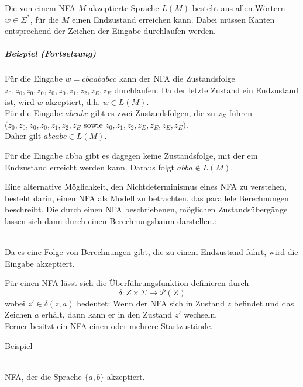 \documentclass[a4paper]{scrartcl}
\begin{document}
Die von einem NFA $M$ akzeptierte Sprache $L(M)$ besteht aus allen Wörtern $w \in \Sigma^*$, für die $M$ einen Endzustand erreichen kann. Dabei müssen Kanten entsprechend der Zeichen der Eingabe durchlaufen werden.

\subparagraph{Beispiel (Fortsetzung)} Für die Eingabe $w=cbaab\underline{abc}c$ kann der NFA die Zustandsfolge $z_0,z_0,z_0,z_0,z_0,z_0,z_1,z_2,z_E,z_E$ durchlaufen. Da der letzte Zustand ein Endzustand ist, wird $w$ akzeptiert, d.h. $w \in L(M)$.\\
Für die Eingabe $abcabc$ gibt es zwei Zustandsfolgen, die zu $z_E$ führen $(z_0,z_0,z_0,z_0,z_1,z_2,z_E$ sowie $ z_0,z_1,z_2,z_E,z_E,z_E,z_E)$.\\ Daher gilt $abcabc \in L(M)$.

Für die Eingabe abba gibt es dagegen keine Zustandsfolge, mit der ein Endzustand erreicht werden kann. Daraus folgt $abba \notin L(M)$.

Eine alternative Möglichkeit, den Nichtdeterminismus eines NFA zu verstehen, besteht darin, einen NFA als Modell zu betrachten, das parallele Berechnungen beschreibt. Die durch einen NFA beschriebenen, möglichen Zustandsübergänge lassen sich dann durch einen Berechnungsbaum darstellen.:\\
\\
Da es eine Folge von Berechnungen gibt, die zu einem Endzustand führt, wird die Eingabe akzeptiert.

Für einen NFA lässt sich die Überführungsfunktion definieren durch
\[ \delta: Z \times \Sigma \to \mathcal{P}(Z) \]
wobei $z' \in \delta(z,a)$ bedeutet: Wenn der NFA sich in Zustand $z$ befindet und das Zeichen $a$ erhält, dann kann er in den Zustand $z'$ wechseln.\\
Ferner besitzt ein NFA einen oder mehrere Startzustände.

Beispiel\\
\\
NFA, der die Sprache $\{a,b\}$ akzeptiert.
\end{document}
